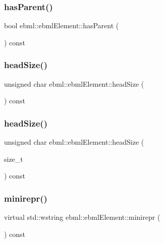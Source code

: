 \subsubsection{\texorpdfstring{has\+Parent()}{hasParent()}}
{\footnotesize\ttfamily bool ebml\+::ebml\+Element\+::has\+Parent (\begin{DoxyParamCaption}{ }\end{DoxyParamCaption}) const}

\mbox{\label{classebml_1_1ebmlElement_a9305dc06339d900f81bd986653457e28}} 
\subsubsection{\texorpdfstring{head\+Size()}{headSize()}\hspace{0.1cm}{\footnotesize\ttfamily [1/2]}}
{\footnotesize\ttfamily unsigned char ebml\+::ebml\+Element\+::head\+Size (\begin{DoxyParamCaption}{ }\end{DoxyParamCaption}) const}

\mbox{\label{classebml_1_1ebmlElement_a87e926e72a5c1280b674573256dc08b1}} 
\subsubsection{\texorpdfstring{head\+Size()}{headSize()}\hspace{0.1cm}{\footnotesize\ttfamily [2/2]}}
{\footnotesize\ttfamily unsigned char ebml\+::ebml\+Element\+::head\+Size (\begin{DoxyParamCaption}\item[{size\+\_\+t}]{ }\end{DoxyParamCaption}) const}

\mbox{\label{classebml_1_1ebmlElement_a7852173aeef78bd843939ae5a82f1d1c}} 
\subsubsection{\texorpdfstring{minirepr()}{minirepr()}}
{\footnotesize\ttfamily virtual std\+::wstring ebml\+::ebml\+Element\+::minirepr (\begin{DoxyParamCaption}{ }\end{DoxyParamCaption}) const\hspace{0.3cm}{\ttfamily [pure virtual]}}



